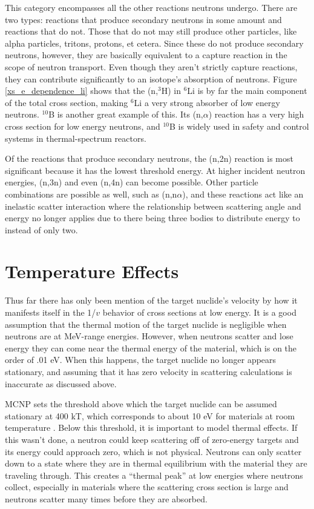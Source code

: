 This category encompasses all the other reactions neutrons undergo.  There are two types: reactions that produce secondary neutrons in some amount and reactions that do not.  Those that do not may still produce other particles, like alpha particles, tritons, protons, et cetera.  Since these do not produce secondary neutrons, however, they are basically equivalent to a capture reaction in the scope of neutron transport.  Even though they aren't strictly capture reactions, they can contribute significantly to an isotope's absorption of neutrons.  Figure \ref{xs_e_dependence_li} shows that the (n,$^3$H) in $^{6}$Li is by far the main component of the total cross section, making $^{6}$Li a very strong absorber of low energy neutrons.  $^{10}$B is another great example of this.  Its (n,$\alpha$) reaction has a very high cross section for low energy neutrons, and $^10$B is widely used in safety and control systems in thermal-spectrum reactors.

Of the reactions that produce secondary neutrons, the (n,2n) reaction is most significant because it has the lowest threshold energy.  At higher incident neutron energies, (n,3n) and even (n,4n) can become possible.  Other particle combinations are possible as well, such as (n,n$\alpha$), and these reactions act like an inelastic scatter interaction where the relationship between scattering angle and energy no longer applies due to there being three bodies to distribute energy to instead of only two.


\section{Temperature Effects}
\label{sec:temp}

Thus far there has only been mention of the target nuclide's velocity by how it manifests itself in the 1/$v$ behavior of cross sections at low energy.  It is a good assumption that the thermal motion of the target nuclide is negligible when neutrons are at MeV-range energies.  However, when neutrons scatter and lose energy they can come near the thermal energy of the material, which is on the order of .01 eV.  When this happens, the target nuclide no longer appears stationary, and assuming that it has zero velocity in scattering calculations is inaccurate as discussed above. 

MCNP sets the threshold above which the target nuclide can be assumed stationary at 400 kT, which corresponds to about 10 eV for materials at room temperature \cite{mcnp}.  Below this threshold, it is important to model thermal effects.  If this wasn't done, a neutron could keep scattering off of zero-energy targets and its energy could approach zero, which is not physical.  Neutrons can only scatter down to a state where they are in thermal equilibrium with the material they are traveling through.  This creates a ``thermal peak'' at low energies where neutrons collect, especially in materials where the scattering cross section is large and neutrons scatter many times before they are absorbed.

